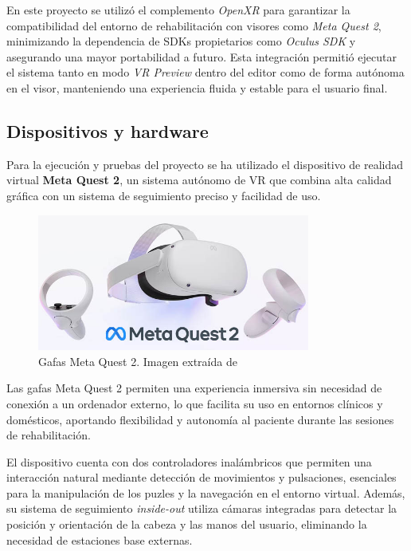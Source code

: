 En este proyecto se utilizó el complemento \textit{OpenXR} para garantizar la compatibilidad del entorno de rehabilitación con visores como \textit{Meta Quest 2}, minimizando la dependencia de SDKs propietarios como \textit{Oculus SDK} y asegurando una mayor portabilidad a futuro. Esta integración permitió ejecutar el sistema tanto en modo \textit{VR Preview} dentro del editor como de forma autónoma en el visor, manteniendo una experiencia fluida y estable para el usuario final.


\subsection{Dispositivos y hardware}

Para la ejecución y pruebas del proyecto se ha utilizado el dispositivo de realidad virtual \textbf{Meta Quest 2}, un sistema autónomo de VR que combina alta calidad gráfica con un sistema de seguimiento preciso y facilidad de uso.

\begin{figure}[h]
	\centering
	\includegraphics[width=0.8\textwidth]{../img/memoria/metaquest_2.jpg}
	\caption[Imagen de las gafas metaquest 2]{Gafas Meta Quest 2. Imagen extraída de ~\cite{metaquest2025}}
	\label{img:metaquest2}
\end{figure}

Las gafas Meta Quest 2 permiten una experiencia inmersiva sin necesidad de conexión a un ordenador externo, lo que facilita su uso en entornos clínicos y domésticos, aportando flexibilidad y autonomía al paciente durante las sesiones de rehabilitación. 

El dispositivo cuenta con dos controladores inalámbricos que permiten una interacción natural mediante detección de movimientos y pulsaciones, esenciales para la manipulación de los puzles y la navegación en el entorno virtual. Además, su sistema de seguimiento \textit{inside-out} utiliza cámaras integradas para detectar la posición y orientación de la cabeza y las manos del usuario, eliminando la necesidad de estaciones base externas.

